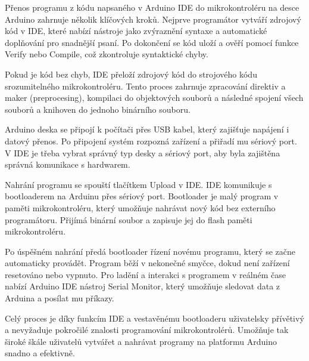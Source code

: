 Přenos programu z kódu napsaného v Arduino IDE do mikrokontroléru na desce Arduino zahrnuje několik klíčových kroků.
Nejprve programátor vytváří zdrojový kód v IDE, které nabízí nástroje jako zvýraznění syntaxe a automatické doplňování pro snadnější psaní.
Po dokončení se kód uloží a ověří pomocí funkce Verify nebo Compile, což zkontroluje syntaktické chyby.

Pokud je kód bez chyb, IDE přeloží zdrojový kód do strojového kódu srozumitelného mikrokontroléru.
Tento proces zahrnuje zpracování direktiv a maker (preprocesing), kompilaci do objektových souborů a následné spojení všech souborů a knihoven do jednoho binárního souboru.

Arduino deska se připojí k počítači přes USB kabel, který zajišťuje napájení i datový přenos.
Po připojení systém rozpozná zařízení a přiřadí mu sériový port.
V IDE je třeba vybrat správný typ desky a sériový port, aby byla zajištěna správná komunikace s hardwarem.

Nahrání programu se spouští tlačítkem Upload v IDE. IDE komunikuje s bootloaderem na Arduinu přes sériový port.
Bootloader je malý program v paměti mikrokontroléru, který umožňuje nahrávat nový kód bez externího programátoru.
Přijímá binární soubor a zapisuje jej do flash paměti mikrokontroléru.

Po úspěšném nahrání předá bootloader řízení novému programu, který se začne automaticky provádět.
Program běží v nekonečné smyčce, dokud není zařízení resetováno nebo vypnuto.
Pro ladění a interakci s programem v reálném čase nabízí Arduino IDE nástroj Serial Monitor, který umožňuje sledovat data z Arduina a posílat mu příkazy.

Celý proces je díky funkcím IDE a vestavěnému bootloaderu uživatelsky přívětivý a nevyžaduje pokročilé znalosti programování mikrokontrolérů.
Umožňuje tak široké škále uživatelů vytvářet a nahrávat programy na platformu Arduino snadno a efektivně.



